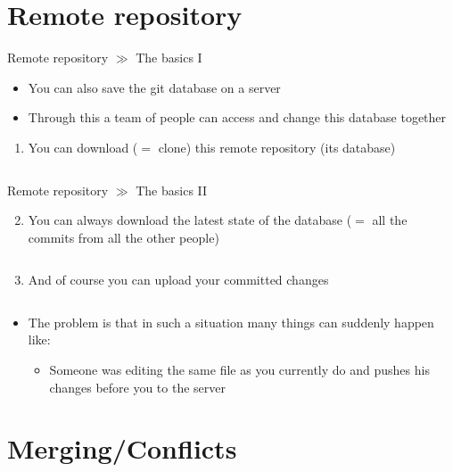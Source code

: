 \documentclass[10pt]{beamer}
\begin{document}
\section{Remote repository}

\begin{frame}{Remote repository $\gg$ The basics I}
	\begin{itemize}
		\item You can also save the git database on a server
		\item Through this a team of people can access and change this database together
	\end{itemize}
	\begin{enumerate}
		\item You can download ($=$ clone) this remote repository (its database)
		\inputminted[bgcolor=lightGreyCustom,fontsize=\scriptsize]{sh}{./resources/git_remote_repository_01_clone.sh}
	\end{enumerate}
\end{frame}

\begin{frame}{Remote repository $\gg$ The basics II}
	\begin{enumerate}\setcounter{enumi}{1}
		\item You can always download the latest state of the database ($=$ all the commits from all the other people)
		\inputminted[bgcolor=lightGreyCustom,fontsize=\scriptsize]{sh}{./resources/git_remote_repository_02_pull.sh}
		\item And of course you can upload your committed changes
		\inputminted[bgcolor=lightGreyCustom,fontsize=\scriptsize]{sh}{./resources/git_remote_repository_02_push.sh}
	\end{enumerate}
	\begin{itemize}
		\item The problem is that in such a situation many things can suddenly happen like:
		\begin{itemize}
			\item Someone was editing the same file as you currently do and pushes his changes before you to the server
		\end{itemize}
	\end{itemize}
\end{frame}

\section{Merging/Conflicts}
\end{document}
